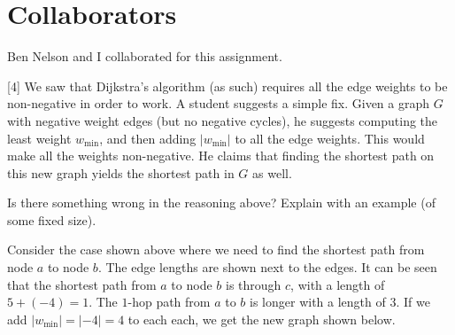 \documentclass[addpoints]{exam}
\begin{document}
\section*{Collaborators}

Ben Nelson and I collaborated for this assignment.

\begin{questions}

[4]
We saw that Dijkstra's algorithm (as such) requires all the edge weights to be non-negative in order to work. A student suggests a simple fix. Given a graph $G$ with negative weight edges (but no negative cycles), he suggests computing the least weight $w_{\min}$, and then adding $|w_{\min}|$ to all the edge weights. This would make all the weights non-negative. He claims that finding the shortest path on this new graph yields the shortest path in $G$ as well.

Is there something wrong in the reasoning above? Explain with an example (of some fixed size).

\begin{center}
\end{center}

Consider the case shown above where we need to find the shortest path from node $a$ to node $b$. The edge lengths are shown next to the edges. It can be seen that the shortest path from $a$ to node $b$ is through $c$, with a length of $5+(-4)=1$. The $1$-hop path from $a$ to $b$ is longer with a length of $3$. If we add $|w_{\min}| = |-4| =4$ to each each, we get the new graph shown below.

\begin{center}
  \begin{tikzpicture}[
            > = stealth, %
            shorten > = 1pt, %
            auto,
            node distance = 2cm, %
            semithick %
        ]


\end{tikzpicture}
\end{center}
\end{questions}
\end{document}
